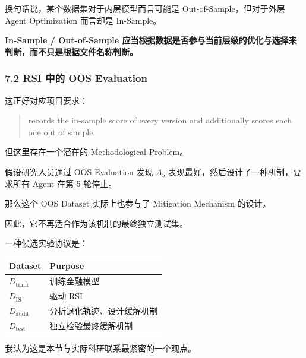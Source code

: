 换句话说，某个数据集对于内层模型而言可能是 Out-of-Sample，但对于外层 Agent Optimization 而言却是 In-Sample。

\textbf{In-Sample / Out-of-Sample 应当根据数据是否参与当前层级的优化与选择来判断，而不只是根据文件名称判断。}

\hypertarget{part-2-12-0001-rsi-ux4e2dux7684-oos-evaluation}{%
\subsubsection{7.2 RSI 中的 OOS Evaluation}\label{part-2-12-0001-rsi-ux4e2dux7684-oos-evaluation}}


这正好对应项目要求：

\begin{quote}
records the in-sample score of every version and additionally scores each one out of sample.
\end{quote}

但这里存在一个潜在的 Methodological Problem。

假设研究人员通过 OOS Evaluation 发现 \(A_5\) 表现最好，然后设计了一种机制，要求所有 Agent 在第 5 轮停止。

那么这个 OOS Dataset 实际上也参与了 Mitigation Mechanism 的设计。

因此，它不再适合作为该机制的最终独立测试集。

一种候选实验协议是：

\begin{readertable}
\begin{longtable}[]{@{}
  >{\raggedright\arraybackslash}p{}
  >{\raggedright\arraybackslash}p{}@{}}
\toprule
Dataset & Purpose \\
\midrule
\endhead
\(D_{\mathrm{train}}\) & 训练金融模型 \\
\(D_{\mathrm{IS}}\) & 驱动 RSI \\
\(D_{\mathrm{audit}}\) & 分析退化轨迹、设计缓解机制 \\
\(D_{\mathrm{test}}\) & 独立检验最终缓解机制 \\
\bottomrule
\end{longtable}
\end{readertable}

我认为这是本节与实际科研联系最紧密的一个观点。

